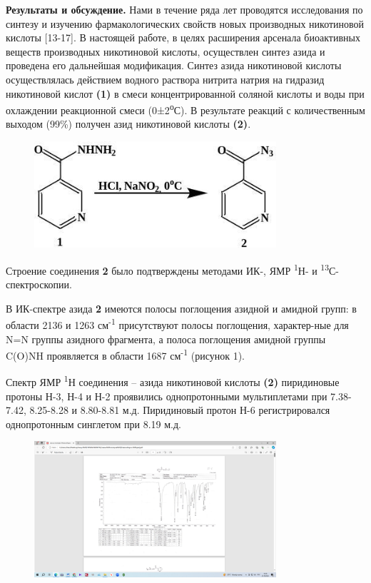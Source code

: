 {\bfseries Результаты и обсуждение.} Нами в течение ряда лет проводятся
исследования по синтезу и изучению фармакологических свойств новых
производных никотиновой кислоты {[}13-17{]}. В настоящей работе, в целях
расширения арсенала биоактивных веществ производных никотиновой кислоты,
осуществлен синтез азида и проведена его дальнейшая модификация. Синтез
азида никотиновой кислоты осуществлялась действием водного раствора
нитрита натрия на гидразид никотиновой кислот {\bfseries (1)} в смеси
концентрированной соляной кислоты и воды при охлаждении реакционной
смеси (0±2\textsuperscript{о}С). В результате реакций с количественным
выходом (99\%) получен азид никотиновой кислоты {\bfseries (2)}.

\begin{figure}[H]
	\centering
	\includegraphics[width=0.8\textwidth]{assets/1}
	\caption*{}
\end{figure}

Строение соединения {\bfseries 2} было подтверждены методами ИК-, ЯМР
\textsuperscript{1}Н- и \textsuperscript{13}С-спектроскопии.

В ИК-спектре азида {\bfseries 2} имеются полосы поглощения азидной и
амидной групп: в области 2136 и 1263 см\textsuperscript{-1} присутствуют
полосы поглощения, характер-ные для N=N группы азидного фрагмента, а
полоса поглощения амидной группы C(O)NH проявляется в области 1687
см\textsuperscript{-1} (рисунок 1).

Спектр ЯМР \textsuperscript{1}Н соединения -- азида никотиновой кислоты
{\bfseries (2)} пиридиновые протоны Н-3, Н-4 и Н-2 проявились
однопротонными мультиплетами при 7.38-7.42, 8.25-8.28 и 8.80-8.81 м.д.
Пиридиновый протон Н-6 регистрировался однопротонным синглетом при 8.19
м.д.

\begin{figure}[H]
	\centering
	\includegraphics[width=0.8\textwidth]{assets/2}
	\caption*{}
\end{figure}

